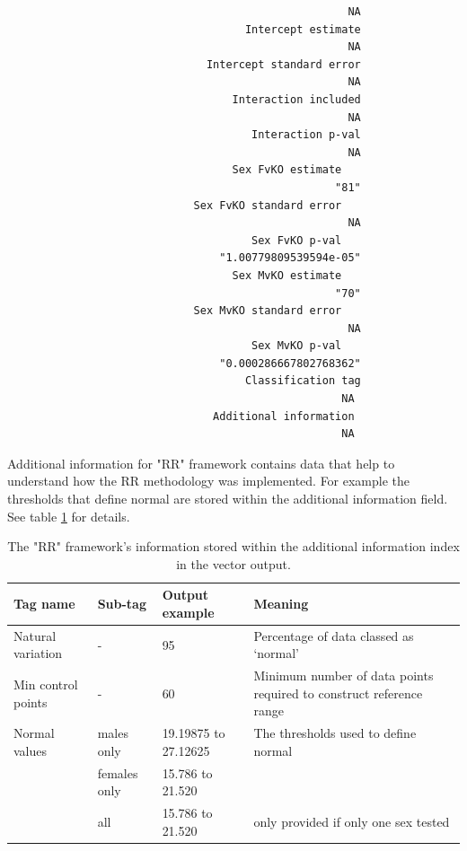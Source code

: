 \documentclass[12pt,a4paper]{article}
\begin{document}
\begin{verbatim}
                                                     NA 
                                     Intercept estimate 
                                                     NA 
                               Intercept standard error 
                                                     NA 
                                   Interaction included 
                                                     NA 
                                      Interaction p-val 
                                                     NA 
                                   Sex FvKO estimate 
                                                   "81" 
                             Sex FvKO standard error 
                                                     NA 
                                      Sex FvKO p-val 
                                 "1.00779809539594e-05" 
                                   Sex MvKO estimate 
                                                   "70" 
                             Sex MvKO standard error 
                                                     NA 
                                      Sex MvKO p-val 
                                 "0.000286667802768362" 
                                     Classification tag 
													NA
								Additional information
													NA
\end{verbatim}
\endgroup

Additional information for "RR" framework contains data that help to understand how the RR methodology was implemented. For example the thresholds that define normal are stored within the additional information field. See table \ref{table:071} for details. 

\begin{table}
 
\begin{tabular}{| l | p{2.5cm} |  p{2cm}  | p{5cm} |}
  \hline
Tag name&Sub-tag&Output example&Meaning\\\hline
Natural variation&-&95&Percentage of data classed as ‘normal’\\
Min control points&-&60&
Minimum number of data points required to construct reference range\\
Normal values&males only&19.19875 to 27.12625&The thresholds used to define normal\\
&females only&15.786 to 21.520&\\
&all&15.786 to 21.520&only provided if only one sex tested\\
\hline  
\end{tabular}
\caption{The "RR" framework's information stored within the additional information index in the vector output. }\label{table:071}
\end{table}
\end{document}
